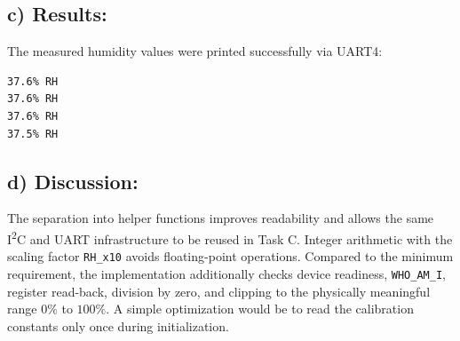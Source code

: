 \subsection{c) Results:}

The measured humidity values were printed successfully via UART4:

\begin{lstlisting}[caption={UART output of the humidity measurement}]
37.6% RH
37.6% RH
37.6% RH
37.5% RH
\end{lstlisting}

\subsection{d) Discussion:}

The separation into helper functions improves readability and allows the same I\textsuperscript{2}C and UART infrastructure to be reused in Task C. Integer arithmetic with the scaling factor \texttt{RH\_x10} avoids floating-point operations. Compared to the minimum requirement, the implementation additionally checks device readiness, \texttt{WHO\_AM\_I}, register read-back, division by zero, and clipping to the physically meaningful range $0\%$ to $100\%$. A simple optimization would be to read the calibration constants only once during initialization.

